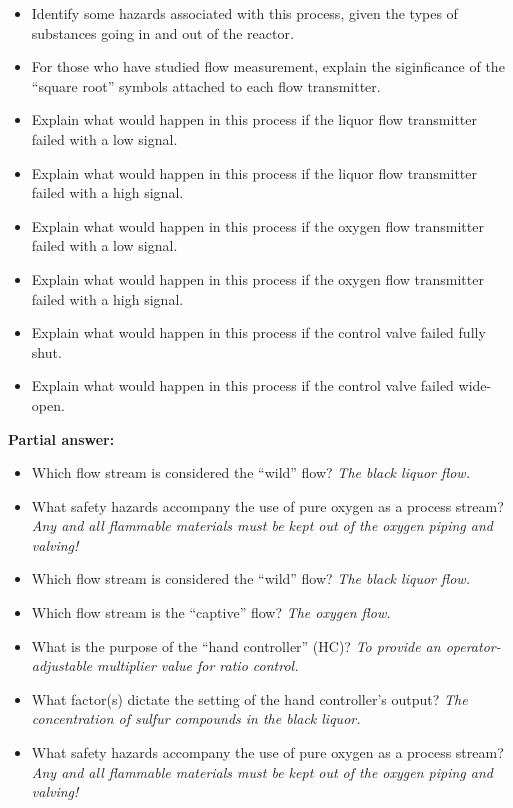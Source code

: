 \begin{itemize}
\item{} Identify some hazards associated with this process, given the types of substances going in and out of the reactor.
\item{} For those who have studied flow measurement, explain the siginficance of the ``square root'' symbols attached to each flow transmitter.
\item{} Explain what would happen in this process if the liquor flow transmitter failed with a low signal.
\item{} Explain what would happen in this process if the liquor flow transmitter failed with a high signal.
\item{} Explain what would happen in this process if the oxygen flow transmitter failed with a low signal.
\item{} Explain what would happen in this process if the oxygen flow transmitter failed with a high signal.
\item{} Explain what would happen in this process if the control valve failed fully shut.
\item{} Explain what would happen in this process if the control valve failed wide-open.
\end{itemize}







\noindent
{\bf Partial answer:}

\vskip 10pt

\begin{itemize}
\item{} Which flow stream is considered the ``wild'' flow? {\it The black liquor flow.}
\item{} What safety hazards accompany the use of pure oxygen as a process stream? {\it Any and all flammable materials must be kept out of the oxygen piping and valving!}
\end{itemize}







\begin{itemize}
\item{} Which flow stream is considered the ``wild'' flow? {\it The black liquor flow.}
\item{} Which flow stream is the ``captive'' flow? {\it The oxygen flow.}
\item{} What is the purpose of the ``hand controller'' (HC)? {\it To provide an operator-adjustable multiplier value for ratio control.}
\item{} What factor(s) dictate the setting of the hand controller's output? {\it The concentration of sulfur compounds in the black liquor.}
\item{} What safety hazards accompany the use of pure oxygen as a process stream? {\it Any and all flammable materials must be kept out of the oxygen piping and valving!}
\end{itemize}


